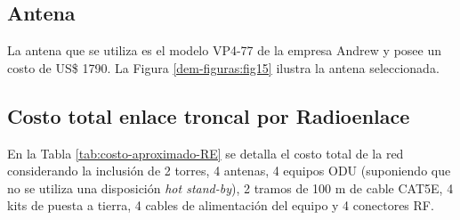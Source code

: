 


\subsection{Antena}

La antena que se utiliza es el modelo VP4-77 de la empresa Andrew y posee un costo de US\$ 1790. La Figura \ref{dem-figuras:fig15} ilustra la antena seleccionada.


\subsection{Costo total enlace troncal por Radioenlace}

En la Tabla \ref{tab:costo-aproximado-RE} se detalla el costo total de la red considerando la inclusión de 2 torres, 4 antenas, 4 equipos ODU (suponiendo que no se utiliza una disposición \textit{hot stand-by}), 2 tramos de 100 m de cable CAT5E, 4 kits de puesta a tierra, 4 cables de alimentación del equipo y 4 conectores RF.

